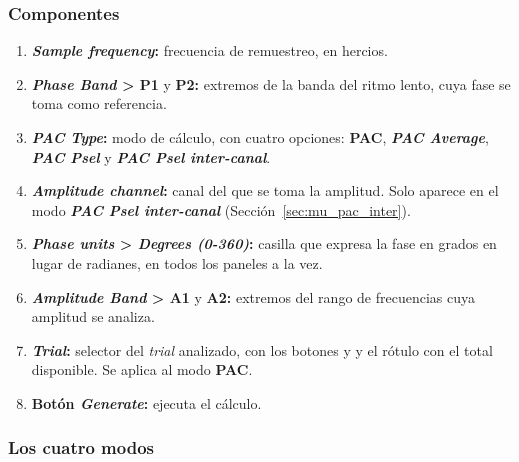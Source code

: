 \documentclass[11pt,a4paper]{article}
\begin{document}
    \subsubsection*{Componentes}
    \begin{enumerate}
        \item \textbf{\textit{Sample frequency}:} frecuencia de remuestreo, en hercios.
        \item \textbf{\textit{Phase Band} > P1} y \textbf{P2:} extremos de la banda del ritmo lento, cuya fase se toma como referencia.
        \item \textbf{\textit{PAC Type}:} modo de c\'alculo, con cuatro opciones: \textbf{PAC}, \textbf{\textit{PAC Average}}, \textbf{\textit{PAC Psel}} y \textbf{\textit{PAC Psel inter-canal}}.
        \item \textbf{\textit{Amplitude channel}:} canal del que se toma la amplitud. Solo aparece en el modo \textbf{\textit{PAC Psel inter-canal}} (Secci\'on~\ref{sec:mu_pac_inter}).
        \item \textbf{\textit{Phase units} > \textit{Degrees (0-360)}:} casilla que expresa la fase en grados en lugar de radianes, en todos los paneles a la vez.
        \item \textbf{\textit{Amplitude Band} > A1} y \textbf{A2:} extremos del rango de frecuencias cuya amplitud se analiza.
        \item \textbf{\textit{Trial}:} selector del \textit{trial} analizado, con los botones \textbf{\guilsinglleft} y \textbf{\guilsinglright} y el r\'otulo con el total disponible. Se aplica al modo \textbf{PAC}.
        \item \textbf{Bot\'on \textit{Generate}:} ejecuta el c\'alculo.
    \end{enumerate}

    \subsubsection*{Los cuatro modos}
\end{document}
